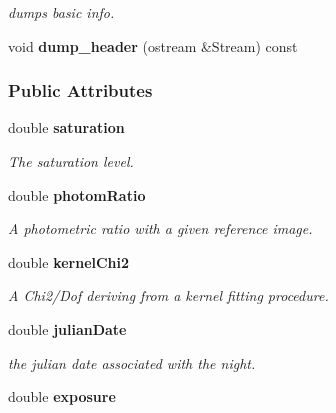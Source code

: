 \begin{CompactItemize}
\begin{CompactList}\small\item\em dumps basic info.\item\end{CompactList}\item 
{}
void {\bf dump\_\-header} (ostream \&Stream) const\label{class_night_a8}

\end{CompactItemize}
\subsubsection*{Public Attributes}
\begin{CompactItemize}
\item 
{}
double {\bf saturation}\label{class_night_m0}

\begin{CompactList}\small\item\em The saturation level.\item\end{CompactList}\item 
{}
double {\bf photom\-Ratio}\label{class_night_m1}

\begin{CompactList}\small\item\em A photometric ratio with a given reference image.\item\end{CompactList}\item 
{}
double {\bf kernel\-Chi2}\label{class_night_m2}

\begin{CompactList}\small\item\em A Chi2/Dof deriving from a kernel fitting procedure.\item\end{CompactList}\item 
{}
double {\bf julian\-Date}\label{class_night_m3}

\begin{CompactList}\small\item\em the julian date associated with the night.\item\end{CompactList}\item 
{}
double {\bf exposure}\label{class_night_m4}


\end{CompactItemize}
